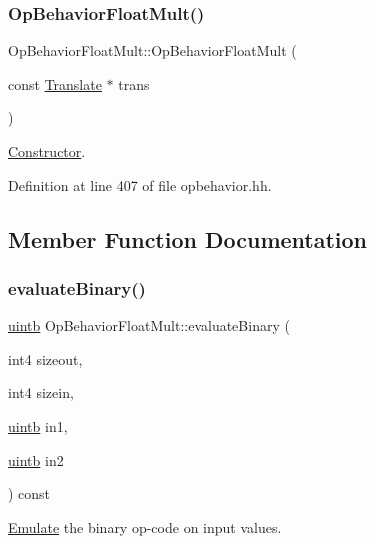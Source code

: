 \subsubsection{\texorpdfstring{OpBehaviorFloatMult()}{OpBehaviorFloatMult()}}
{\footnotesize\ttfamily Op\+Behavior\+Float\+Mult\+::\+Op\+Behavior\+Float\+Mult (\begin{DoxyParamCaption}\item[{const \mbox{\hyperlink{class_translate}{Translate}} $\ast$}]{trans }\end{DoxyParamCaption})\hspace{0.3cm}{\ttfamily [inline]}}



\mbox{\hyperlink{class_constructor}{Constructor}}. 



Definition at line 407 of file opbehavior.\+hh.



\subsection{Member Function Documentation}
\mbox{\label{class_op_behavior_float_mult_aeaa5adbdc1db8b6351a974fa656bc649}} 
\subsubsection{\texorpdfstring{evaluateBinary()}{evaluateBinary()}}
{\footnotesize\ttfamily \mbox{\hyperlink{types_8h_a2db313c5d32a12b01d26ac9b3bca178f}{uintb}} Op\+Behavior\+Float\+Mult\+::evaluate\+Binary (\begin{DoxyParamCaption}\item[{int4}]{sizeout,  }\item[{int4}]{sizein,  }\item[{\mbox{\hyperlink{types_8h_a2db313c5d32a12b01d26ac9b3bca178f}{uintb}}}]{in1,  }\item[{\mbox{\hyperlink{types_8h_a2db313c5d32a12b01d26ac9b3bca178f}{uintb}}}]{in2 }\end{DoxyParamCaption}) const\hspace{0.3cm}{\ttfamily [virtual]}}



\mbox{\hyperlink{class_emulate}{Emulate}} the binary op-\/code on input values. 


